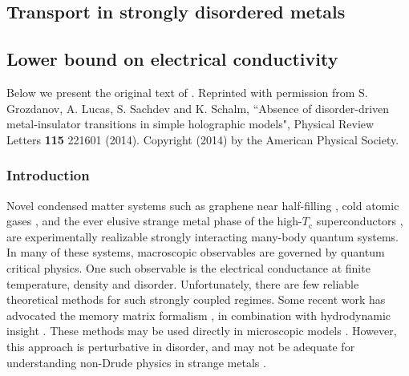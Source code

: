 \documentclass[10pt, oneside]{book}
\begin{document}
\begin{doublespace}


\part{Transport in strongly disordered metals}




\chapter{Lower bound on electrical conductivity}

Below we present the original text of \cite{Grozdanov:2015qia}.   Reprinted with permission from S. Grozdanov, A. Lucas, S. Sachdev and K. Schalm,  ``Absence of disorder-driven metal-insulator transitions in simple holographic models",  Physical Review Letters \textbf{115} 221601 (2014).   Copyright (2014) by the American Physical Society.

\section{Introduction} Novel condensed matter systems such as graphene near half-filling \cite{muller2009}, cold atomic gases \cite{adams}, and the ever elusive strange metal phase of the high-$T_{\mathrm{c}}$ superconductors \cite{lt, sk, kasahara}, are experimentally realizable strongly interacting many-body quantum systems.
In many of these systems, macroscopic observables are governed by quantum critical physics.  One such observable is the electrical conductance at finite temperature, density and disorder.  Unfortunately, there are few reliable theoretical methods for such strongly coupled regimes.   Some recent work has advocated the memory matrix formalism \cite{zwanzig, mori, forster1995, Lucas:2015pxa}, in combination with hydrodynamic insight \cite{hkms}.   These methods may be used directly in microscopic models \cite{Hartnoll:2014gba,Patel:2014jfa,DHSS15}.   However, this approach is perturbative in disorder, and may not be adequate for understanding non-Drude physics in strange metals \cite{Hartnoll:2014lpa}.


\end{doublespace}
\end{document}
